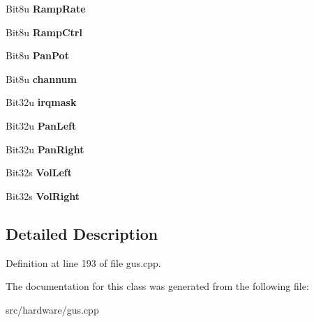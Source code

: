 \begin{DoxyCompactItemize}
\item 
\hypertarget{classGUSChannels_a795f8eff74ef91bcd3f2e56786b2ae7f}{Bit8u {\bfseries Ramp\-Rate}}\label{classGUSChannels_a795f8eff74ef91bcd3f2e56786b2ae7f}

\item 
\hypertarget{classGUSChannels_a5e53c3d380059e69241d4c2228d6b963}{Bit8u {\bfseries Ramp\-Ctrl}}\label{classGUSChannels_a5e53c3d380059e69241d4c2228d6b963}

\item 
\hypertarget{classGUSChannels_adfc57391f631967a421c68151bc8d406}{Bit8u {\bfseries Pan\-Pot}}\label{classGUSChannels_adfc57391f631967a421c68151bc8d406}

\item 
\hypertarget{classGUSChannels_ac4025f25e64fc8c0f235cdd513faf16b}{Bit8u {\bfseries channum}}\label{classGUSChannels_ac4025f25e64fc8c0f235cdd513faf16b}

\item 
\hypertarget{classGUSChannels_ab2ef78abf686814c7473539bcc197bb5}{Bit32u {\bfseries irqmask}}\label{classGUSChannels_ab2ef78abf686814c7473539bcc197bb5}

\item 
\hypertarget{classGUSChannels_a4285b8115475dff18dea76784d83ba7c}{Bit32u {\bfseries Pan\-Left}}\label{classGUSChannels_a4285b8115475dff18dea76784d83ba7c}

\item 
\hypertarget{classGUSChannels_a09b3ccc1cf8099c083e3c238ad1d8778}{Bit32u {\bfseries Pan\-Right}}\label{classGUSChannels_a09b3ccc1cf8099c083e3c238ad1d8778}

\item 
\hypertarget{classGUSChannels_a0aeb797744c172611694b90b15d50e56}{Bit32s {\bfseries Vol\-Left}}\label{classGUSChannels_a0aeb797744c172611694b90b15d50e56}

\item 
\hypertarget{classGUSChannels_a65730a7c7a5b4b64ca4519604a44b56c}{Bit32s {\bfseries Vol\-Right}}\label{classGUSChannels_a65730a7c7a5b4b64ca4519604a44b56c}

\end{DoxyCompactItemize}


\subsection{Detailed Description}


Definition at line 193 of file gus.\-cpp.



The documentation for this class was generated from the following file\-:\begin{DoxyCompactItemize}
\item 
src/hardware/gus.\-cpp\end{DoxyCompactItemize}
